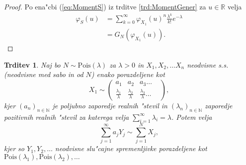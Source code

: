 \documentclass[12pt, a4paper, reqno]{amsart}
\theoremstyle{definition}
\theoremstyle{plain}
\newtheorem{trditev}[definicija]{Trditev}
\newcommand{\R}{\mathbb{R}}
\newcommand{\N}{\mathbb{N}}
\newcommand{\1}{\mathds{1}}
\newcommand{\Pois}[1]{\text{Pois}(#1)}
\begin{document}
    \begin{proof}
        Po ena"cbi (\ref{eq:MomentS}) iz trditve \ref{trd:MomentGener} za $u\in\R$ velja
        \begin{align*}
            \varphi_{S}(u) &= \sum_{k=0}^{\infty}
            \varphi_{X_1}(u)^n\frac{\lambda^k}{k!}e^{-\lambda} \\
            &= G_{N}\left(\varphi_{X_1}(u)\right).
        \end{align*}
    \end{proof}


    \begin{trditev}
        Naj bo $N\sim \Pois{\lambda}$  za $\lambda >0$ in $X_1, X_2, \dots X_n$ neodvisne s.s. (neodvisne 
        med sabo in od $N$) enako porazdeljene kot
        $$ X_1\sim
        \begin{pmatrix}
            a_1 & a_2 & a_3  \dots & \\
            \tfrac{\lambda_1}{\lambda} & \tfrac{\lambda_2}{\lambda} & \tfrac{\lambda_3}{\lambda} \dots & 
        \end{pmatrix},
        $$
        kjer $(a_n)_{n\in\N}$ je poljubno zaporedje realnih "stevil in 
        $(\lambda_n)_{n\in\N}$ zaporedje pozitivnih realnih "stevil za katerega velja 
        ${\sum_{i=1}^\infty\lambda_i = \lambda}$.
        Potem velja 
        \begin{equation*}
            \sum_{j=1}^\infty a_jY_j \sim \sum_{j=1}^NX_j,
        \end{equation*}
        kjer so $Y_1,Y_2,  \dots$ neodvisne slu"cajne spremenljivke porazdeljene kot \\
        $\Pois{\lambda_1},\Pois{\lambda_2}, \dots$
        \label{trd:NXjeEnakoaY}
    \end{trditev}
\end{document}
